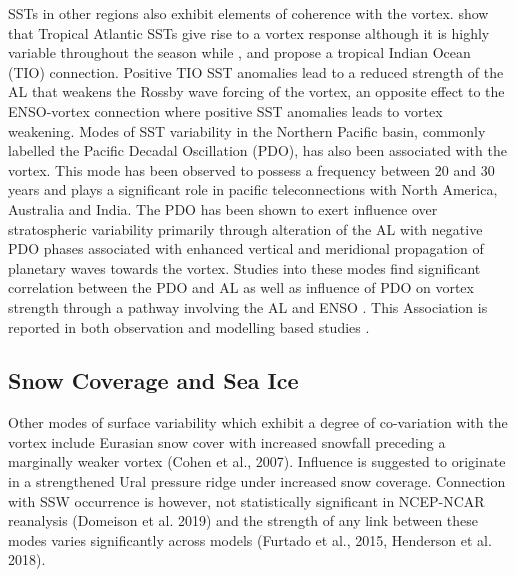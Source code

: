 SSTs in other regions also exhibit elements of coherence with the vortex. \cite{Rao2017} show that Tropical Atlantic SSTs give rise to a vortex response although it is highly variable throughout the season while \cite{Fletcher}, \cite{Fletcher_model} and \cite{Rao2015} propose a tropical Indian Ocean (TIO) connection. Positive TIO SST anomalies lead to a reduced strength of the AL that weakens the Rossby wave forcing of the vortex, an opposite effect to the ENSO-vortex connection where positive SST anomalies leads to vortex weakening. Modes of SST variability in the Northern Pacific basin, commonly labelled the Pacific Decadal Oscillation (PDO), has also been associated with the vortex. This mode has been observed to possess a frequency between 20 and 30 years \citep{Henley2015} and plays a significant role in pacific teleconnections with North America, Australia and India. The PDO has been shown to exert influence over stratospheric variability primarily through alteration of the AL with negative PDO phases associated with enhanced vertical and meridional propagation of planetary waves towards the vortex. Studies into these modes find significant correlation between the PDO and AL \citep{Mantua_1997, Rodionov2005} as well as influence of PDO on vortex strength through a pathway involving the AL and ENSO \citep{rao2019}. This Association is reported in both observation and modelling based studies  \citep{Garcia-Herrera2006,Kren2016,Kang2017,Hu2018}. 

\subsection{Snow Coverage and Sea Ice}
Other modes of surface variability which exhibit a degree of co-variation with the vortex include Eurasian snow cover with increased snowfall preceding a marginally weaker vortex (Cohen et al., 2007). Influence is suggested to originate in a strengthened Ural pressure ridge under increased snow coverage. Connection with SSW occurrence is however, not statistically significant in NCEP-NCAR reanalysis (Domeison et al. 2019) and the strength of any link between these modes varies significantly across models (Furtado et al., 2015, Henderson et al. 2018). 

